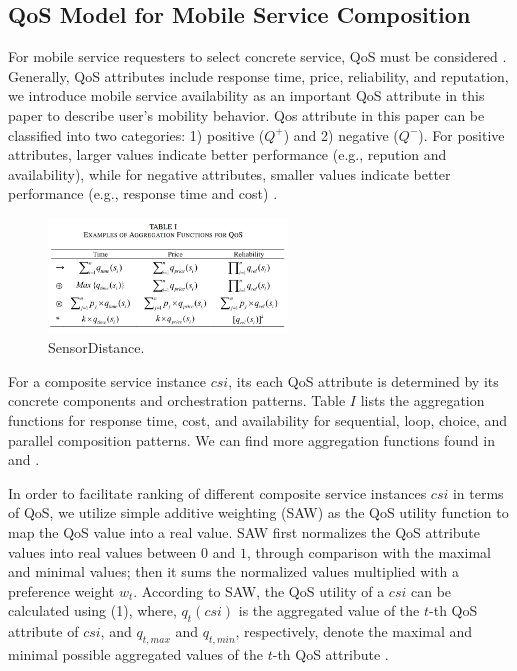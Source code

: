 \documentclass[10pt,journal,compsoc]{IEEEtran}
\begin{document}
\subsection{QoS Model for Mobile Service Composition}
For mobile service requesters to select concrete service, QoS must be considered \cite{wu2013predicting,luo2014efficient,luo2016generating}. Generally, QoS attributes include response time, price, reliability, and reputation, we introduce mobile service availability as an important QoS attribute in this paper to describe user's mobility behavior. Qos attribute in this paper can be classified into two categories: 1) positive ($Q^+$) and 2) negative ($Q^{-}$). For positive attributes, larger values indicate better performance (e.g., repution and availability), while for negative attributes, smaller values indicate better performance (e.g., response time and cost) \cite{Wu2016}.	

\begin{figure}[!t]
\centering
\includegraphics[width=2.5in]{./img/fig4.png}
\caption{SensorDistance.}
\label{fig_sim}
\end{figure}

For a composite service instance $csi$, its each QoS attribute is determined by its concrete components and orchestration patterns. Table $I$ lists the aggregation functions for response time, cost, and availability for sequential, loop, choice, and parallel composition patterns. We can find more aggregation functions found in \cite{jaeger2004qos} and \cite{zheng2013qos}.

In order to facilitate ranking of different composite service instances $csi$ in terms of QoS, we utilize simple additive weighting (SAW) as the QoS utility function to map the QoS value into a real value. SAW first normalizes the QoS attribute values into real values between $0$ and $1$, through comparison with the maximal and minimal values; then it sums the normalized values multiplied with a preference weight $w_t$. According to SAW, the QoS utility of a $csi$ can be calculated using (1), where, $q_t(csi)$ is the aggregated value of the $t$-th QoS attribute of $csi$, and $q_{t,max}$ and $q_{t,min}$, respectively, denote the maximal and minimal possible aggregated values of the $t$-th QoS attribute \cite{Wu2016}.
\end{document}

